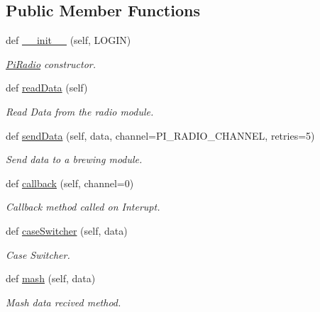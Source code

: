 \subsection*{Public Member Functions}
\begin{DoxyCompactItemize}
\item 
def \mbox{\hyperlink{classu_ccoms_1_1_pi_radio_ae0022ce300195d9fd5de907e925ec739}{\+\_\+\+\_\+init\+\_\+\+\_\+}} (self, L\+O\+G\+IN)
\begin{DoxyCompactList}\small\item\em \mbox{\hyperlink{classu_ccoms_1_1_pi_radio}{Pi\+Radio}} constructor. \end{DoxyCompactList}\item 
def \mbox{\hyperlink{classu_ccoms_1_1_pi_radio_a319c15c0bf996c01e7b6032c56292ffe}{read\+Data}} (self)
\begin{DoxyCompactList}\small\item\em Read Data from the radio module. \end{DoxyCompactList}\item 
def \mbox{\hyperlink{classu_ccoms_1_1_pi_radio_a78cdababf2338a12369f6df3b5be792c}{send\+Data}} (self, data, channel=P\+I\+\_\+\+R\+A\+D\+I\+O\+\_\+\+C\+H\+A\+N\+N\+EL, retries=5)
\begin{DoxyCompactList}\small\item\em Send data to a brewing module. \end{DoxyCompactList}\item 
def \mbox{\hyperlink{classu_ccoms_1_1_pi_radio_a6a6fa8055cf1688958aa352a455f5f9a}{callback}} (self, channel=0)
\begin{DoxyCompactList}\small\item\em Callback method called on Interupt. \end{DoxyCompactList}\item 
def \mbox{\hyperlink{classu_ccoms_1_1_pi_radio_a1d5a545a875881e2285dab568d56b119}{case\+Switcher}} (self, data)
\begin{DoxyCompactList}\small\item\em Case Switcher. \end{DoxyCompactList}\item 
def \mbox{\hyperlink{classu_ccoms_1_1_pi_radio_a20e5d7ecc576a999860cdbda75040dd9}{mash}} (self, data)
\begin{DoxyCompactList}\small\item\em Mash data recived method. \end{DoxyCompactList}\item 

\end{DoxyCompactItemize}
